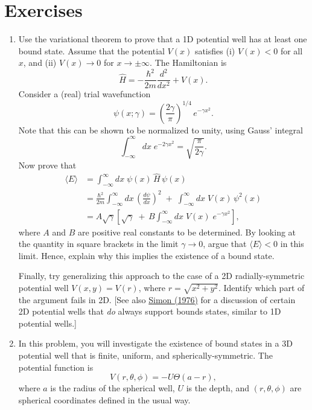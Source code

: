 \documentclass[pra,12pt]{revtex4}
\begin{document}
\section*{Exercises}

\begin{enumerate}
\item Use the variational theorem to prove that a 1D potential well
  has at least one bound state.  Assume that the potential $V(x)$
  satisfies (i) $V(x) < 0$ for all $x$, and (ii) $V(x)\rightarrow 0$
  for $x\rightarrow\pm\infty$.  The Hamiltonian is
  $$\hat{H} = - \frac{\hbar^2}{2m} \frac{d^2}{dx^2} + V(x).$$
  Consider a (real) trial wavefunction
  $$\psi(x;\gamma) = \left(\frac{2\gamma}{\pi}\right)^{1/4} \,e^{-\gamma x^2}.$$
  Note that this can be shown to be normalized to unity, using Gauss'
  integral
  $$\int_{-\infty}^{\infty} dx\; e^{-2\gamma x^2} = \sqrt{\frac{\pi}{2\gamma}}.$$
  Now prove that
  $$\begin{aligned}
      \langle E \rangle &= \int_{-\infty}^\infty dx \; \psi(x) \, \hat{H} \,\psi(x) \\
      &= \frac{\hbar^2}{2m} \int_{-\infty}^\infty dx\, \left(\frac{d\psi}{dx}\right)^2
      \;+\; \int_{-\infty}^\infty dx\; V(x) \,\psi^2(x) \\
      &= A\sqrt{\gamma} \left[\sqrt{\gamma}
        \;+\, B \int_{-\infty}^\infty dx\; V(x) \;e^{-\gamma x^2}
        \right],
    \end{aligned}$$
  where $A$ and $B$ are positive real constants to be determined.  By
  looking at the quantity in square brackets in the limit $\gamma
  \rightarrow 0$, argue that $\langle E \rangle < 0$ in this limit.
  Hence, explain why this implies the existence of a bound state.

  Finally, try generalizing this approach to the case of a 2D
  radially-symmetric potential well $V(x,y) = V(r)$, where $r =
  \sqrt{x^2+y^2}$.  Identify which part of the argument fails in 2D.
       [See also \hyperref[cite:simon]{Simon (1976)} for a discussion
         of certain 2D potential wells that \textit{do} always support
         bounds states, similar to 1D potential wells.]
  \label{ex:boundstate}

\item In this problem, you will investigate the existence of bound
  states in a 3D potential well that is finite, uniform, and
  spherically-symmetric.  The potential function is
$$V(r,\theta,\phi) = -U\Theta(a-r),$$
  where $a$ is the radius of the spherical well, $U$ is the depth,
  and $(r,\theta,\phi)$ are spherical coordinates defined in the usual
  way.


\end{enumerate}
\end{document}
